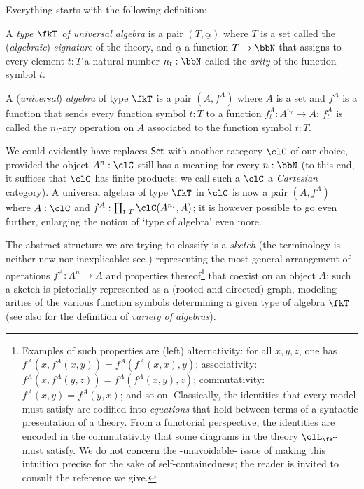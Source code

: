 Everything starts with the following definition:
\begin{definition}\label{unialg}
	A \emph{type $\fkT$ of universal algebra} is a pair $(T,\underline{\alpha})$ where $T$ is a set called the (\emph{algebraic}) \emph{signature} of the theory, and $\underline\alpha$ a function $T \to \bbN$ that assigns to every element $t: T$ a natural number $n_t: \bbN$ called the \emph{arity} of the function symbol $t$.
\end{definition}
\begin{definition}
	A (\emph{universal}) \emph{algebra} of type $\fkT$ is a pair $(A,f^A)$ where $A$ is a set and $f^A$ is a function that sends every function symbol $t: T$ to a function $f^A_t: A^{n_t} \to A$; $f^A_t$ is called the $n_t$-ary operation on $A$ associated to the function symbol $t: T$.
\end{definition}
We could evidently have replaces $\mathsf{Set}$ with another category $\clC$ of our choice, provided the object $A^n: \clC$ still has a meaning for every $n: \bbN$ (to this end, it suffices that $\clC$ has finite products; we call such a $\clC$ a \emph{Cartesian} category). A universal algebra of type $\fkT$ in $\clC$ is now a pair $(A,f^A)$ where $A: \clC$ and $f^A: \prod_{t: T} \clC(A^{n_t},A )$; it is however possible to go even further, enlarging the notion of `type of algebra' even more.

The abstract structure we are trying to classify is a \emph{sketch} (the terminology is neither new nor inexplicable: see \cite{ehresmann1968esquisses,coppey1984leccons, Bor2}) representing the most general arrangement of operations $f^A: A^n \to A$ and properties thereof\footnote{Examples of such properties are (left) alternativity: for all $x,y,z$, one has $f^A(x,f^A(x,y)) = f^A(f^A(x,x),y)$; associativity: $f^A(x,f^A(y,z)) = f^A(f^A(x,y),z)$; commutativity: $f^A(x,y)=f^A(y,x)$; and so on. Classically, the identities that every model must satisfy are codified into \emph{equations} that hold between terms of a syntactic presentation of a theory. From a functorial perspective, the identities are encoded in the commutativity that some diagrams in the theory $\clL_{\fkT}$ must satisfy. We do not concern the -unavoidable- issue of making this intuition precise for the sake of self-containedness; the reader is invited to consult the reference we give.} that coexist on an object $A$; such a sketch is pictorially represented as a (rooted and directed) graph, modeling arities of the various function symbols determining a given type of algebra $\fkT$ (see also \cite[XV.3]{grillet2007abstract} for the definition of \emph{variety of algebras}).

